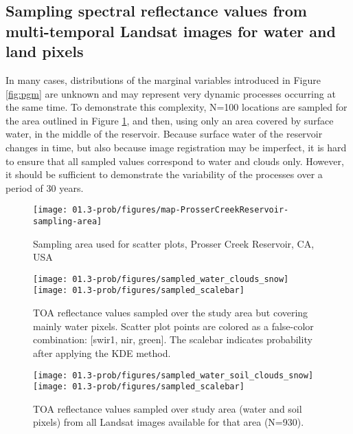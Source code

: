\subsection{Sampling spectral reflectance values from multi-temporal Landsat images for water and land pixels}

In many cases, distributions of the marginal variables introduced in Figure \ref{fig:pgm} are unknown and may represent very dynamic processes occurring at the same time. To demonstrate this complexity, N=100 locations are sampled for the area outlined in Figure \ref{fig:study-area-PC}, and then, using only an area covered by surface water, in the middle of the reservoir. Because surface water of the reservoir changes in time, but also because image registration may be imperfect, it is hard to ensure that all sampled values correspond to water and clouds only. However, it should be sufficient to demonstrate the variability of the processes over a period of 30 years.

\begin{figure}[H]
	\texttt{[image: 01.3-prob/figures/map-ProsserCreekReservoir-sampling-area]}
	\centering
	\captionsetup{justification=centering}
	\caption{Sampling area used for scatter plots, Prosser Creek Reservoir, CA, USA}
	\label{fig:study-area-PC}
\end{figure}

\begin{figure}[H]
	\texttt{[image: 01.3-prob/figures/sampled\_water\_clouds\_snow]}
	\texttt{[image: 01.3-prob/figures/sampled\_scalebar]}

	\caption{TOA reflectance values sampled over the study area but covering mainly water pixels. Scatter plot points are colored as a false-color combination: [swir1, nir, green]. The scalebar indicates probability after applying the \gls{KDE} method.}
	\label{fig:prob-sampled-water-cloud-snow}
\end{figure}

\begin{figure}[H]
	\texttt{[image: 01.3-prob/figures/sampled\_water\_soil\_clouds\_snow]}
	\texttt{[image: 01.3-prob/figures/sampled\_scalebar]}
	
	\caption{TOA reflectance values sampled over study area (water and soil pixels) from all Landsat images available for that area (N=930).}

	\label{fig:prob-sampled-water-soil-cloud-snow}
\end{figure}

